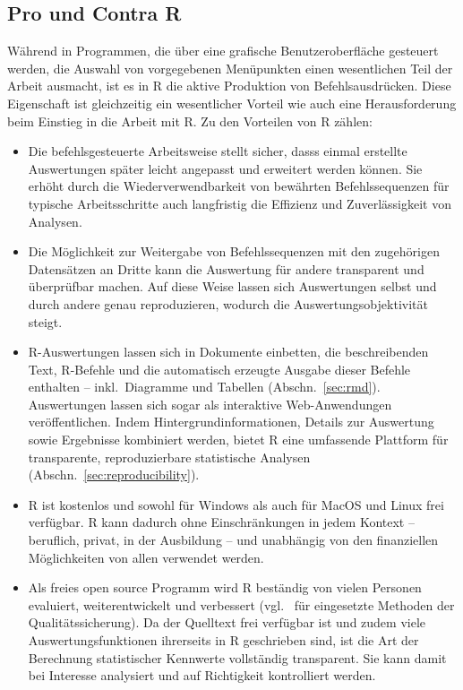 \subsection{Pro und Contra R}

Während in Programmen, die über eine grafische Benutzeroberfläche gesteuert werden, die Auswahl von vorgegebenen Menüpunkten einen wesentlichen Teil der Arbeit ausmacht, ist es in R die aktive Produktion von Befehlsausdrücken. Diese Eigenschaft ist gleichzeitig ein wesentlicher Vorteil wie auch eine Herausforderung beim Einstieg in die Arbeit mit R. Zu den Vorteilen von R zählen:

\begin{itemize}
\item Die befehlsgesteuerte Arbeitsweise stellt sicher, dasss einmal erstellte Auswertungen später leicht angepasst und erweitert werden können. Sie erhöht durch die Wiederverwendbarkeit von bewährten Befehlssequenzen für typische Arbeitsschritte auch langfristig die Effizienz und Zuverlässigkeit von Analysen.
\item Die Möglichkeit zur Weitergabe von Befehlssequenzen mit den zugehörigen Datensätzen an Dritte kann die Auswertung für andere transparent und überprüfbar machen. Auf diese Weise lassen sich Auswertungen selbst und durch andere genau reproduzieren, wodurch die Auswertungsobjektivität steigt.
\item R-Auswertungen lassen sich in Dokumente einbetten, die beschreibenden Text, R-Befehle und die automatisch erzeugte Ausgabe dieser Befehle enthalten -- inkl.\ Diagramme und Tabellen (Abschn.\ \ref{sec:rmd}). Auswertungen lassen sich sogar als interaktive Web-Anwendungen veröffentlichen. Indem Hintergrundinformationen, Details zur Auswertung sowie Ergebnisse kombiniert werden, bietet R eine umfassende Plattform für transparente, reproduzierbare statistische Analysen (Abschn.\ \ref{sec:reproducibility}).
\item R ist kostenlos und sowohl für Windows als auch für MacOS und Linux frei verfügbar. R kann dadurch ohne Einschränkungen in jedem Kontext -- beruflich, privat, in der Ausbildung -- und unabhängig von den finanziellen Möglichkeiten von allen verwendet werden.
\item Als freies open source Programm wird R beständig von vielen Personen evaluiert, weiterentwickelt und verbessert (vgl.\  für eingesetzte Methoden der Qualitätssicherung). Da der Quelltext frei verfügbar ist und zudem viele Auswertungsfunktionen ihrerseits in R geschrieben sind, ist die Art der Berechnung statistischer Kennwerte vollständig transparent. Sie kann damit bei Interesse analysiert und auf Richtigkeit kontrolliert werden.

\end{itemize}
